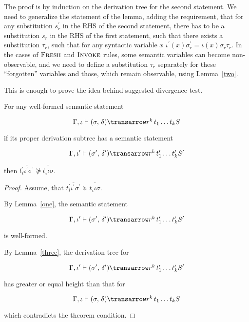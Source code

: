 The proof is by induction on the derivation tree for the second statement. We need to generalize the statement of the lemma, adding the requirement, that 
for any substitution $s^\prime_r$ in the RHS of the second statement, there has to be a substitution $s_r$ in the RHS of the first statement,
such that there exists a substitution $\tau_r$, such that for any syntactic variable $x$ \mbox{$\iota^\prime(x) \sigma^\prime_r = \iota(x) \sigma_r \tau_r$}. 
In the cases of $\textsc{Fresh}$ and $\textsc{Invoke}$ rules, some semantic variables can become non-observable, and we need to define a substitution $\tau_r$ 
separately for these ``forgotten'' variables and those, which remain observable, using Lemma~\ref{two}.

This is enough to prove the idea behind suggested divergence test.

\begin{theorem}
\normalfont
For any well-formed semantic statement 

$$
\otrans{\Gamma,\iota}{(\sigma,\,\delta)}{r^k\,t_1\dots t_k}{S}
$$ 

if its proper derivation subtree has a semantic statement 

$$
\otrans{\Gamma,\iota^\prime}{(\sigma^\prime,\,\delta^\prime)}{r^k\,t^\prime_1\dots t^\prime_k}{S^\prime}
$$

then \mbox{$\overline{t^\prime_i \iota^\prime \sigma^\prime} \not \succeq \overline{t^{\phantom{\prime}}_i \iota \sigma}$}. 
\end{theorem}
\begin{proof}
Assume, that \mbox{$\overline{t^\prime_i \iota^\prime \sigma^\prime}\succeq \overline{t^{\phantom{\prime}}_i \iota \sigma}$}. 

By Lemma~\ref{one}, the semantic statement

$$
\otrans{\Gamma,\iota^\prime}{(\sigma^\prime,\,\delta^\prime)}{r^k\,t^\prime_1\dots t^\prime_k}{S^\prime}
$$

\noindent is well-formed.

By Lemma~\ref{three}, the derivation tree for

$$
\otrans{\Gamma,\iota^\prime}{(\sigma^\prime,\,\delta^\prime)}{r^k\,t^\prime_1\dots t^\prime_k}{S^\prime}
$$

\noindent has greater or equal height than that for

$$
\otrans{\Gamma,\iota}{(\sigma,\,\delta)}{r^k\,t_1\dots t_k}{S}
$$ 

\noindent which contradicts the theorem condition.
\end{proof}


